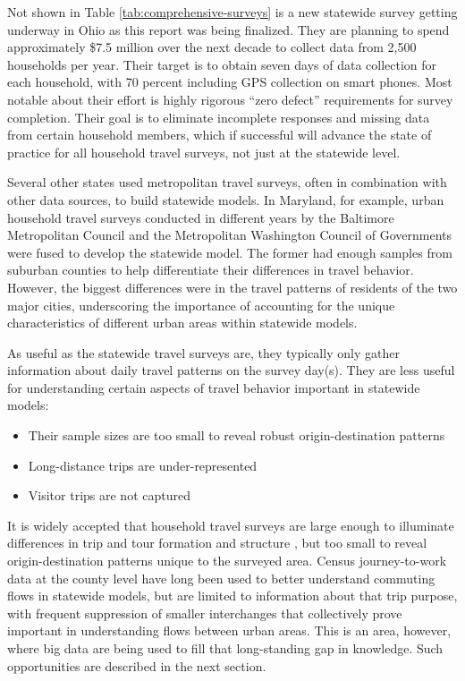 Not shown in Table \ref{tab:comprehensive-surveys} is a new statewide survey getting underway in Ohio as this report was being finalized. They are planning to spend approximately \$7.5 million over the next decade to collect data from 2,500 households per year. Their target is to obtain seven days of data collection for each household, with 70 percent including GPS collection on smart phones. Most notable about their effort is highly rigorous ``zero defect'' requirements for survey completion. Their goal is to eliminate incomplete responses and missing data from certain household members, which if successful will advance the state of practice for all household travel surveys, not just at the statewide level.

Several other states used metropolitan travel surveys, often in combination with other data sources, to build statewide models. In Maryland, for example, urban household travel surveys conducted in different years by the Baltimore Metropolitan Council and the Metropolitan Washington Council of Governments were fused to develop the statewide model. The former had enough samples from suburban counties to help differentiate their differences in travel behavior. However, the biggest differences were in the travel patterns of residents of the two major cities, underscoring the importance of accounting for the unique characteristics of different urban areas within statewide models.

As useful as the statewide travel surveys are, they typically only gather information about daily travel patterns on the survey day(s). They are less useful for understanding certain aspects of travel behavior important in statewide models:
\begin{itemize}
\item Their sample sizes are too small to reveal robust origin-destination patterns
\item Long-distance trips are under-represented
\item Visitor trips are not captured
\end{itemize}

It is widely accepted that household travel surveys are large enough to illuminate differences in trip and tour formation and structure \citep{stopher07}, but too small to reveal origin-destination patterns unique to the surveyed area. Census journey-to-work data at the county level have long been used to better understand commuting flows in statewide models, but are limited to information about that trip purpose, with frequent suppression of smaller interchanges that collectively prove important in understanding flows between urban areas. This is an area, however, where big data are being used to fill that long-standing gap in knowledge. Such opportunities are described in the next section.


